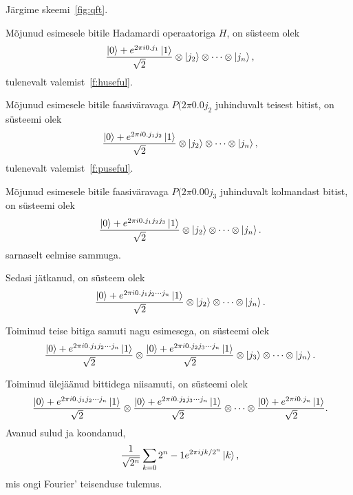 \documentclass[12pt]{article}
\newcommand{\TODO}{\todo[inline]}
\def\ket#1{\mathinner{|#1\rangle}}
\begin{document}
Järgime skeemi~\ref{fig:qft}.

\TODO{Korduv lauseskeem:}

Mõjunud esimesele bitile Hadamardi operaatoriga \(H\), on süsteem olek
\begin{equation}
    \frac{\ket0+e^{2\pi i0.j_1}\ket1}{\sqrt{2}}\otimes\ket{j_2}\otimes\cdots\otimes\ket{j_n}\rlap{,}
\end{equation}
tulenevalt valemist~\eqref{f:huseful}.


Mõjunud esimesele bitile faasiväravaga \(P(2\pi 0.0j_2\) juhinduvalt teisest bitist, on süsteemi olek
\begin{equation}
    \frac{\ket0+e^{2\pi i0.j_1j_2}\ket1}{\sqrt{2}}\otimes\ket{j_2}\otimes\cdots\otimes\ket{j_n}\rlap{,}
\end{equation}
tulenevalt valemist~\eqref{f:puseful}.

Mõjunud esimesele bitile faasiväravaga \(P(2\pi 0.00j_3\) juhinduvalt kolmandast bitist, on süsteemi olek
\begin{equation}
    \frac{\ket0+e^{2\pi i0.j_1j_2j_3}\ket1}{\sqrt{2}}\otimes\ket{j_2}\otimes\cdots\otimes\ket{j_n}\rlap{.}
\end{equation}
sarnaselt eelmise sammuga.

Sedasi jätkanud, on süsteem olek
\begin{equation}
    \frac{\ket0+e^{2\pi i0.j_1j_2\cdots j_n}\ket1}{\sqrt{2}}\otimes\ket{j_2}\otimes\cdots\otimes\ket{j_n}\rlap{.}
\end{equation}

Toiminud teise bitiga samuti nagu esimesega, on süsteemi olek
\begin{equation}
    \frac{\ket0+e^{2\pi i0.j_1j_2\cdots j_n}\ket1}{\sqrt{2}}\otimes
    \frac{\ket0+e^{2\pi i0.j_2j_3\cdots j_n}\ket1}{\sqrt{2}}
    \otimes\ket{j_3}\otimes\cdots\otimes\ket{j_n}\rlap{.}
\end{equation}

Toiminud ülejäänud bittidega niisamuti, on süsteemi olek
\begin{equation}
    \frac{\ket0+e^{2\pi i0.j_1j_2\cdots j_n}\ket1}{\sqrt{2}}\otimes
    \frac{\ket0+e^{2\pi i0.j_2j_3\cdots j_n}\ket1}{\sqrt{2}}
    \otimes\cdots\otimes
    \frac{\ket0+e^{2\pi i0.j_n}\ket1}{\sqrt{2}}\rlap{.}
\end{equation}
Avanud sulud ja koondanud,
\begin{equation}
    \frac{1}{\sqrt{2^n}}\sum_{k=0}{2^n-1}e^{2\pi ijk/2^n}\ket k\rlap{,}
\end{equation}
mis ongi Fourier' teisenduse tulemus.
\end{document}
